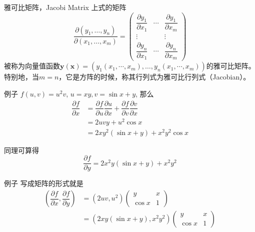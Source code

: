 
\begin{frame}

\begin{block}{雅可比矩阵，Jacobi Matrix}
上式的矩阵
$$\dfrac{\partial(y_1,\ldots,y_n)}{\partial(x_1,\ldots,x_m)} = \begin{pmatrix}
\dfrac{\partial y_1}{\partial x_1} & \cdots & \dfrac{\partial y_1}{\partial x_m} \\
\vdots & & \vdots \\
\dfrac{\partial y_n}{\partial x_1} & \cdots & \dfrac{\partial y_n}{\partial x_m}
\end{pmatrix}$$
被称为向量值函数$\mathbf{y}(\mathbf{x}) = (y_1(x_1,\cdots,x_m), \ldots, y_n(x_1,\cdots,x_m))$的雅可比矩阵。特别地，当$m=n$，它是方阵的时候，称其行列式为雅可比行列式（Jacobian）。
\end{block}

\end{frame}


\begin{frame}

\begin{block}{例子}
$f(u,v) = u^2v$, $u = xy, v=\sin x + y$, 那么
\begin{align*}
\dfrac{\partial f}{\partial x} & = \dfrac{\partial f}{\partial u}\dfrac{\partial u}{\partial x} + \dfrac{\partial f}{\partial v}\dfrac{\partial v}{\partial x} \\
& = 2uvy + u^2\cos x \\
& = 2xy^2(\sin x + y) + x^2y^2\cos x
\end{align*}

\pause
同理可算得
$$\displaystyle \dfrac{\partial f}{\partial y} = 2x^2y(\sin x + y) + x^2y^2$$
\end{block}

\end{frame}


\begin{frame}

\begin{block}{例子}
写成矩阵的形式就是
\begin{align*}
(\dfrac{\partial f}{\partial x}, \dfrac{\partial f}{\partial y}) & = (2uv, u^2) \begin{pmatrix}
y & x \\ \cos x & 1 \end{pmatrix} \\
& = (2xy(\sin x + y), x^2y^2) \begin{pmatrix}
y & x \\ \cos x & 1 \end{pmatrix}
\end{align*}
\end{block}

\end{frame}

